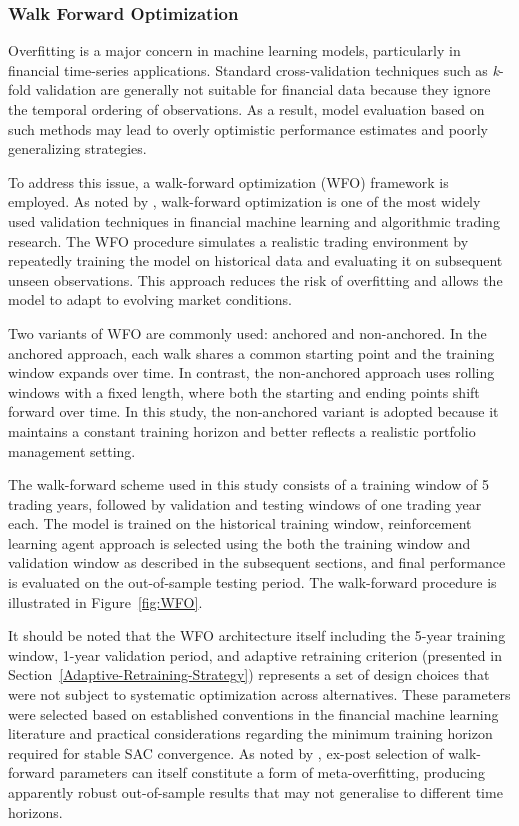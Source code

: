 \documentclass[]{elsarticle}
\begin{document}
\hypertarget{walk-forward-optimization}{%
\subsubsection{Walk Forward Optimization}\label{walk-forward-optimization}}

Overfitting is a major concern in machine learning models, particularly in financial time-series applications. Standard cross-validation techniques such as \emph{k}-fold validation are generally not suitable for financial data because they ignore the temporal ordering of observations. As a result, model evaluation based on such methods may lead to overly optimistic performance estimates and poorly generalizing strategies. 

To address this issue, a walk-forward optimization (WFO) framework is employed. As noted by \citet{cartaetal9355141}, walk-forward optimization is one of the most widely used validation techniques in financial machine learning and algorithmic trading research. The WFO procedure simulates a realistic trading environment by repeatedly training the model on historical data and evaluating it on subsequent unseen observations. This approach reduces the risk of overfitting and allows the model to adapt to evolving market conditions.

Two variants of WFO are commonly used: anchored and non-anchored. In the anchored approach, each walk shares a common starting point and the training window expands over time. In contrast, the non-anchored approach uses rolling windows with a fixed length, where both the starting and ending points shift forward over time. In this study, the non-anchored variant is adopted because it maintains a constant training horizon and better reflects a realistic portfolio management setting.

The walk-forward scheme used in this study consists of a training window of 5 trading years, followed by validation and testing windows of one trading year each. The model is trained on the historical training window, reinforcement learning agent approach is selected using the both the training window and validation window as described in the subsequent sections, and final performance is evaluated on the out-of-sample testing period. The walk-forward procedure is illustrated in Figure~\ref{fig:WFO}.

It should be noted that the WFO architecture itself including the 5-year training window, 1-year validation period, and adaptive retraining criterion (presented in Section~\ref{Adaptive-Retraining-Strategy}) represents a set of design choices that were not subject to systematic optimization across alternatives. These parameters were selected based on established conventions in the financial machine learning literature \citep{cartaetal9355141} and practical considerations regarding the minimum  training horizon required for stable SAC convergence. As noted by \citet{Bailey2014}, ex-post selection of walk-forward parameters can itself constitute a form of meta-overfitting, producing apparently robust out-of-sample results that may not generalise to different time horizons.
\end{document}
